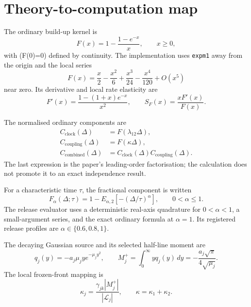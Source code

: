 \documentclass[11pt]{article}
\begin{document}
\section{Theory-to-computation map}

The ordinary build-up kernel is
\begin{equation}
F(x)=1-\frac{1-e^{-x}}{x},\qquad x\geq0,
\label{eq:ordinary}
\end{equation}
with (F(0)=0) defined by continuity. The implementation uses \texttt{expm1} away from the origin and the local series
\begin{equation}
F(x)=\frac{x}{2}-\frac{x^2}{6}+\frac{x^3}{24}-\frac{x^4}{120}+O(x^5)
\end{equation}
near zero. Its derivative and local rate elasticity are
\begin{equation}
F'(x)=\frac{1-(1+x)e^{-x}}{x^2},
\qquad
S_F(x)=\frac{xF'(x)}{F(x)}.
\label{eq:elasticity}
\end{equation}

The normalised ordinary components are
\begin{align}
C_{\mathrm{clock}}(\Delta)&=F(\lambda_{12}\Delta),\\
C_{\mathrm{coupling}}(\Delta)&=F(\kappa\Delta),\\
C_{\mathrm{combined}}(\Delta)&=C_{\mathrm{clock}}(\Delta)C_{\mathrm{coupling}}(\Delta).
\end{align}
The last expression is the paper's leading-order factorisation; the calculation does not promote it to an exact independence result.

For a characteristic time \(\tau\), the fractional component is written
\begin{equation}
F_\alpha(\Delta;\tau)
=1-E_{\alpha,2}\!\left[-(\Delta/\tau)^\alpha\right],
\qquad 0<\alpha\leq1.
\label{eq:fractional}
\end{equation}
The release evaluator uses a deterministic real-axis quadrature for \(0<\alpha<1\), a small-argument series, and the exact ordinary formula at \(\alpha=1\). Its registered release profiles are \(\alpha\in\{0.6,0.8,1\}\).

The decaying Gaussian source and its selected half-line moment are
\begin{equation}
q_j(y)=-a_j\mu_j y e^{-\mu_jy^2},
\qquad
M_j^+=\int_0^\infty yq_j(y)\,dy
=-\frac{a_j\sqrt\pi}{4\sqrt{\mu_j}}.
\label{eq:moment}
\end{equation}
The local frozen-front mapping is
\begin{equation}
\kappa_j=\frac{\gamma_{jk}|M_j^+|}{|\mathcal L_j|},
\qquad
\kappa=\kappa_1+\kappa_2.
\label{eq:response}
\end{equation}
\end{document}
